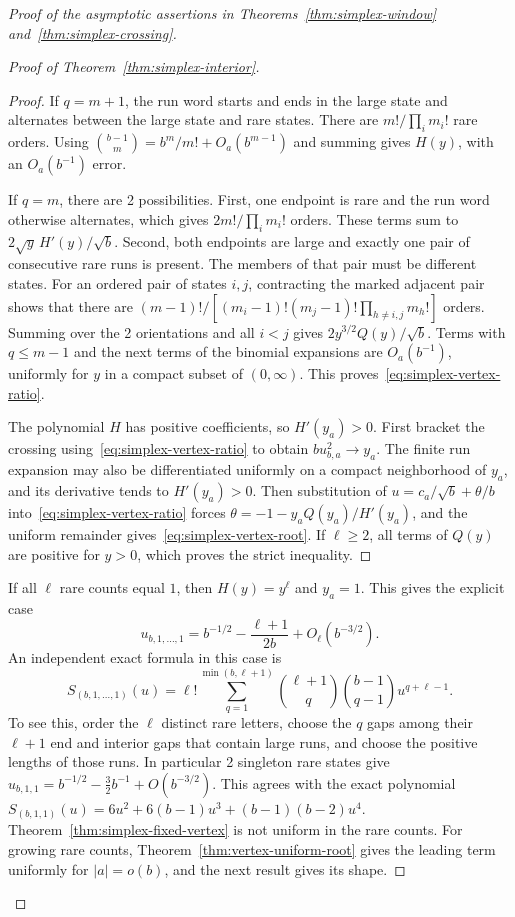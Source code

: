 \begin{proof}[Proof of the asymptotic assertions in
Theorems~\ref{thm:simplex-window} and~\ref{thm:simplex-crossing}]
\begin{proof}[Proof of Theorem~\ref{thm:simplex-interior}]
\begin{proof}
If $q=m+1$, the run word starts and ends in the large state and alternates
between the large state and rare states. There are $m!/\prod_im_i!$ rare
orders. Using $\binom{b-1}{m}=b^m/m!+O_a(b^{m-1})$ and summing gives
$H(y)$, with an $O_a(b^{-1})$ error.

If $q=m$, there are 2 possibilities. First, one endpoint is rare and the
run word otherwise alternates, which gives $2m!/\prod_im_i!$ orders. These
terms sum to $2\sqrt y\,H'(y)/\sqrt b$. Second, both endpoints are large
and exactly one pair of consecutive rare runs is present. The members of
that pair must be different states. For an ordered pair of states $i,j$,
contracting the marked adjacent pair shows that there are
$(m-1)!/[(m_i-1)!(m_j-1)!\prod_{h\ne i,j}m_h!]$ orders. Summing over the 2
orientations and all $i<j$ gives $2y^{3/2}Q(y)/\sqrt b$. Terms with
$q\le m-1$ and the next terms of the binomial expansions are $O_a(b^{-1})$,
uniformly for $y$ in a compact subset of $(0,\infty)$. This
proves~\eqref{eq:simplex-vertex-ratio}.

The polynomial $H$ has positive coefficients, so $H'(y_a)>0$. First
bracket the crossing using~\eqref{eq:simplex-vertex-ratio} to obtain
$bu_{b,a}^2\to y_a$. The finite run expansion may also be differentiated
uniformly on a compact neighborhood of $y_a$, and its derivative tends to
$H'(y_a)>0$. Then substitution of $u=c_a/\sqrt b+\theta/b$
into~\eqref{eq:simplex-vertex-ratio} forces
$\theta=-1-y_aQ(y_a)/H'(y_a)$, and the uniform remainder
gives~\eqref{eq:simplex-vertex-root}. If $\ell\ge2$, all terms of $Q(y)$
are positive for $y>0$, which proves the strict inequality.
\end{proof}

If all $\ell$ rare counts equal $1$, then $H(y)=y^\ell$ and $y_a=1$. This
gives the explicit case
\[
u_{b,1,\ldots,1}=b^{-1/2}-\frac{\ell+1}{2b}
+O_\ell(b^{-3/2}).
\]
An independent exact formula in this case is
\[
S_{(b,1,\ldots,1)}(u)=\ell!
\sum_{q=1}^{\min(b,\ell+1)}
\binom{\ell+1}{q}\binom{b-1}{q-1}u^{q+\ell-1}.
\]
To see this, order the $\ell$ distinct rare letters, choose the $q$ gaps
among their $\ell+1$ end and interior gaps that contain large runs, and
choose the positive lengths of those runs. In particular 2 singleton rare
states give $u_{b,1,1}=b^{-1/2}-\tfrac32b^{-1}+O(b^{-3/2})$. This agrees
with the exact polynomial
$S_{(b,1,1)}(u)=6u^2+6(b-1)u^3+(b-1)(b-2)u^4$.
Theorem~\ref{thm:simplex-fixed-vertex} is not uniform in the rare counts.
For growing rare counts, Theorem~\ref{thm:vertex-uniform-root} gives the
leading term uniformly for $|a|=o(b)$, and the next result gives its shape.


\end{proof}
\end{proof}
